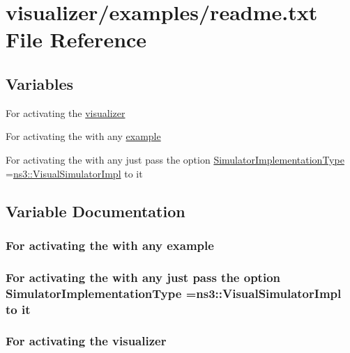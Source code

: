 \hypertarget{examples_2readme_8txt}{}\section{visualizer/examples/readme.txt File Reference}
\label{examples_2readme_8txt}
\subsection*{Variables}
\begin{DoxyCompactItemize}
\item 
For activating the \hyperlink{examples_2readme_8txt_a738ca04bcbc6591f1b7a3a3ce5336595}{visualizer}
\item 
For activating the with any \hyperlink{examples_2readme_8txt_a6cdb5cec86b870240bdc6ba183c19d4e}{example}
\item 
For activating the with any just pass the option \hyperlink{examples_2readme_8txt_ae5f3116f09037aa4aca4128f11ec4a53}{Simulator\+Implementation\+Type} =\hyperlink{classns3_1_1VisualSimulatorImpl}{ns3\+::\+Visual\+Simulator\+Impl} to it
\end{DoxyCompactItemize}


\subsection{Variable Documentation}
\subsubsection[{\texorpdfstring{example}{example}}]{\setlength{\rightskip}{0pt plus 5cm}For activating the with any example}\hypertarget{examples_2readme_8txt_a6cdb5cec86b870240bdc6ba183c19d4e}{}\label{examples_2readme_8txt_a6cdb5cec86b870240bdc6ba183c19d4e}
\subsubsection[{\texorpdfstring{Simulator\+Implementation\+Type}{SimulatorImplementationType}}]{\setlength{\rightskip}{0pt plus 5cm}For activating the with any just pass the option Simulator\+Implementation\+Type ={\bf ns3\+::\+Visual\+Simulator\+Impl} to it}\hypertarget{examples_2readme_8txt_ae5f3116f09037aa4aca4128f11ec4a53}{}\label{examples_2readme_8txt_ae5f3116f09037aa4aca4128f11ec4a53}
\subsubsection[{\texorpdfstring{visualizer}{visualizer}}]{\setlength{\rightskip}{0pt plus 5cm}For activating the visualizer}\hypertarget{examples_2readme_8txt_a738ca04bcbc6591f1b7a3a3ce5336595}{}\label{examples_2readme_8txt_a738ca04bcbc6591f1b7a3a3ce5336595}

